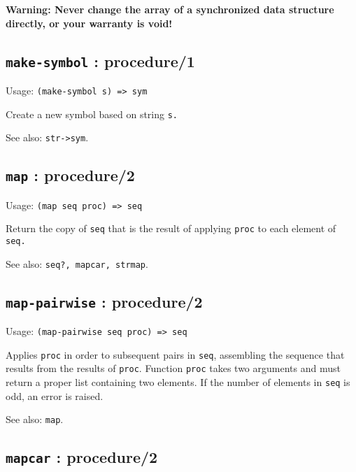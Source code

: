 \documentclass[
]{article}
\newcommand{\passthrough}[1]{#1}
\begin{document}
\textbf{Warning: Never change the array of a synchronized data structure
directly, or your warranty is void!}

\hypertarget{make-symbol-procedure1-1}{%
\subsection{\texorpdfstring{\texttt{make-symbol} :
procedure/1}{make-symbol : procedure/1}}\label{make-symbol-procedure1-1}}

Usage: \passthrough{\lstinline!(make-symbol s) => sym!}

Create a new symbol based on string \passthrough{\lstinline!s.!}

See also: \passthrough{\lstinline!str->sym!}.

\hypertarget{map-procedure2-1}{%
\subsection{\texorpdfstring{\texttt{map} :
procedure/2}{map : procedure/2}}\label{map-procedure2-1}}

Usage: \passthrough{\lstinline!(map seq proc) => seq!}

Return the copy of \passthrough{\lstinline!seq!} that is the result of
applying \passthrough{\lstinline!proc!} to each element of
\passthrough{\lstinline!seq.!}

See also: \passthrough{\lstinline!seq?, mapcar, strmap!}.

\hypertarget{map-pairwise-procedure2-1}{%
\subsection{\texorpdfstring{\texttt{map-pairwise} :
procedure/2}{map-pairwise : procedure/2}}\label{map-pairwise-procedure2-1}}

Usage: \passthrough{\lstinline!(map-pairwise seq proc) => seq!}

Applies \passthrough{\lstinline!proc!} in order to subsequent pairs in
\passthrough{\lstinline!seq!}, assembling the sequence that results from
the results of \passthrough{\lstinline!proc!}. Function
\passthrough{\lstinline!proc!} takes two arguments and must return a
proper list containing two elements. If the number of elements in
\passthrough{\lstinline!seq!} is odd, an error is raised.

See also: \passthrough{\lstinline!map!}.

\hypertarget{mapcar-procedure2-1}{%
\subsection{\texorpdfstring{\texttt{mapcar} :
procedure/2}{mapcar : procedure/2}}\label{mapcar-procedure2-1}}
\end{document}
